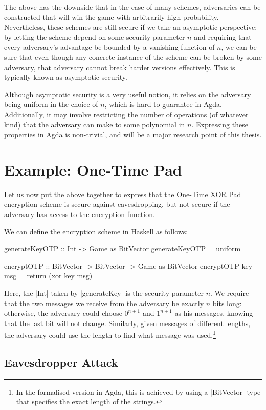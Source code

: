The above has the downside that in the case of many schemes, adversaries can be constructed that will win the game with
arbitrarily high probability.  Nevertheless, these schemes are still secure if we take an asymptotic perspective: by
letting the scheme depend on some security parameter $n$ and requiring that every adversary's advantage be bounded by a
vanishing function of $n$, we can be sure that even though any concrete instance of the scheme can be broken by some
adversary, that adversary cannot break harder versions effectively.  This is typically known as asymptotic security.

Although asymptotic security is a very useful notion, it relies on the adversary being uniform in the choice of $n$,
which is hard to guarantee in Agda.  Additionally, it may involve restricting the number of operations (of whatever
kind) that the adversary can make to some polynomial in $n$.  Expressing these properties in Agda is non-trivial, and
will be a major research point of this thesis.

\section{Example: One-Time Pad}

Let us now put the above together to express that the One-Time XOR Pad encryption scheme is secure against
eavesdropping, but not secure if the adversary has access to the encryption function.

We can define the encryption scheme in Haskell as follows:
\begin{code}
    generateKeyOTP :: Int -> Game as BitVector
    generateKeyOTP = uniform

    encryptOTP :: BitVector -> BitVector -> Game as BitVector
    encryptOTP key msg = return (xor key msg)
\end{code}

Here, the |Int| taken by |generateKey| is the security parameter $n$.  We require that the two messages we receive from
the adversary be exactly $n$ bits long: otherwise, the adversary could choose $0^{n+1}$ and $1^{n+1}$ as his messages,
knowing that the last bit will not change.  Similarly, given messages of different lengths, the adversary could use the
length to find what message was used.\footnote{In the formalised version in Agda, this is achieved by using a
|BitVector| type that specifies the exact length of the strings.}

\subsection{Eavesdropper Attack}

